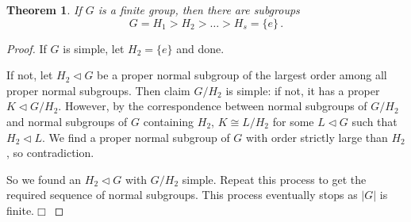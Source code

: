 \documentclass{article}
\theoremstyle{plain}\theoremheaderfont{\normalfont\itshape}\theorembodyfont{\rmfamily}\theoremseparator{.}\newtheorem*{rem}{Remark}\newtheorem*{ex}{Example}\newtheorem*{proof}{Proof}\newtheorem*{altp}{Alternative proof}\newtheorem*{nonex}{Non-Example}
\theoremstyle{plain}\theoremheaderfont{\normalfont\bfseries}\theorembodyfont{\rmfamily}\theoremseparator{.}\newtheorem{thm}{Theorem}[section]\newtheorem{lem}[thm]{Lemma}\newtheorem{prop}[thm]{Proposition}\newtheorem*{cor}{Corollary}\newtheorem{defn}[thm]{Definition}\newtheorem{clm}[thm]{Claim}\newtheorem{clminproof}{Claim}\newtheorem*{notn}{Notation}\newtheorem*{exer}{Exercise}\newtheorem*{lemnn}{Lemma}
\theoremstyle{break}\theoremheaderfont{\normalfont\itshape}\theorembodyfont{\rmfamily}\theoremseparator{.\medskip}\newtheorem*{proofskip}{Proof}\newtheorem*{exs}{Examples}\newtheorem*{rems}{Remarks}\newtheorem*{obs}{Observations}
\theoremstyle{break}\theoremheaderfont{\normalfont\bfseries}\theorembodyfont{\rmfamily}\theoremseparator{.\medskip}\newtheorem{lemskip}[thm]{Lemma}\newtheorem{defnskip}[thm]{Definition}\newtheorem{propskip}[thm]{Proposition}\newtheorem{thmskip}[thm]{Theorem}
\numberwithin{equation}{section}
\newcommand{\qed}{\hfill\ensuremath{\Box}}
\newcommand{\abs}[1]{\left|#1\right|}
\begin{document}
    \begin{thm}
        If \(G\) is a finite group, then there are subgroups
        \[G=H_1>H_2>\dots>H_s=\{e\}\,.\]
    \end{thm}
    \begin{proof}
        If \(G\) is simple, let \(H_2=\{e\}\) and done.

        If not, let \(H_2\lhd G\) be a proper normal subgroup of the largest order among all proper normal subgroups. Then claim \(G/H_2\) is simple: if not, it has a proper \(K\lhd G/H_2\). However, by the correspondence between normal subgroups of \(G/H_2\) and normal subgroups of \(G\) containing \(H_2\), \(K\cong L/H_2\) for some \(L\lhd G\) such that \(H_2\lhd L\). We find a proper normal subgroup of \(G\) with order strictly large than \(H_2\), so contradiction.

        So we found an \(H_2\lhd G\) with \(G/H_2\) simple. Repeat this process to get the required sequence of normal subgroups. This process eventually stops as \(\abs{G}\) is finite.\qed
    \end{proof}
\end{document}
